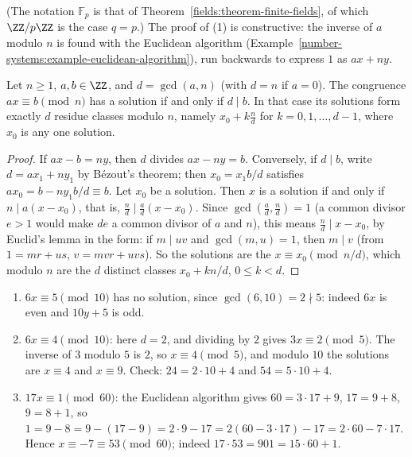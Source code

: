 (The notation $\mathbb{F}_p$ is that of Theorem~\ref{fields:theorem-finite-fields}, of which $\ZZ/p\ZZ$ is the case $q = p$.) The proof of (1) is constructive: the inverse of $a$ modulo $n$ is found with the
Euclidean algorithm (Example~\ref{number-systems:example-euclidean-algorithm}), run backwards to express $1$ as $ax + ny$.

\begin{proposition}\label{number-theory:proposition-linear-congruence}
Let $n \geq 1$, $a, b \in \ZZ$, and $d = \gcd(a, n)$ (with $d = n$ if $a = 0$). The congruence $ax \equiv b \pmod n$ has a solution if and only if $d \mid b$. In that case its solutions form exactly $d$
residue classes modulo $n$, namely $x_0 + k\frac{n}{d}$ for $k = 0, 1, \ldots, d - 1$, where $x_0$ is any one solution.
\end{proposition}

\begin{proof}
If $ax - b = ny$, then $d$ divides $ax - ny = b$. Conversely, if $d \mid b$, write $d = ax_1 + ny_1$ by B\'ezout's theorem; then $x_0 = x_1b/d$ satisfies $ax_0 = b - ny_1b/d \equiv b$. Let $x_0$ be a
solution. Then $x$ is a solution if and only if $n \mid a(x - x_0)$, that is, $\frac{n}{d} \mid \frac{a}{d}(x - x_0)$. Since $\gcd(\frac{a}{d}, \frac{n}{d}) = 1$ (a common divisor $e > 1$ would make $de$
a common divisor of $a$ and $n$), this means $\frac{n}{d} \mid x - x_0$, by Euclid's lemma in the form: if $m \mid uv$ and $\gcd(m, u) = 1$, then $m \mid v$ (from $1 = mr + us$, $v = mvr + uvs$). So the
solutions are the $x \equiv x_0 \pmod{n/d}$, which modulo $n$ are the $d$ distinct classes $x_0 + kn/d$, $0 \leq k < d$.
\end{proof}

\begin{example}\label{number-theory:example-linear-congruence}
\begin{enumerate}
\item $6x \equiv 5 \pmod{10}$ has no solution, since $\gcd(6, 10) = 2 \nmid 5$: indeed $6x$ is even and $10y + 5$ is odd.
\item $6x \equiv 4 \pmod{10}$: here $d = 2$, and dividing by $2$ gives $3x \equiv 2 \pmod 5$. The inverse of $3$ modulo $5$ is $2$, so $x \equiv 4 \pmod 5$, and modulo $10$ the solutions are $x \equiv 4$
and $x \equiv 9$. Check: $24 = 2 \cdot 10 + 4$ and $54 = 5 \cdot 10 + 4$.
\item $17x \equiv 1 \pmod{60}$: the Euclidean algorithm gives $60 = 3 \cdot 17 + 9$, $17 = 9 + 8$, $9 = 8 + 1$, so $1 = 9 - 8 = 9 - (17 - 9) = 2 \cdot 9 - 17 = 2(60 - 3 \cdot 17) - 17 = 2 \cdot 60 - 7 \cdot 17$.
Hence $x \equiv -7 \equiv 53 \pmod{60}$; indeed $17 \cdot 53 = 901 = 15 \cdot 60 + 1$.
\end{enumerate}
\end{example}

